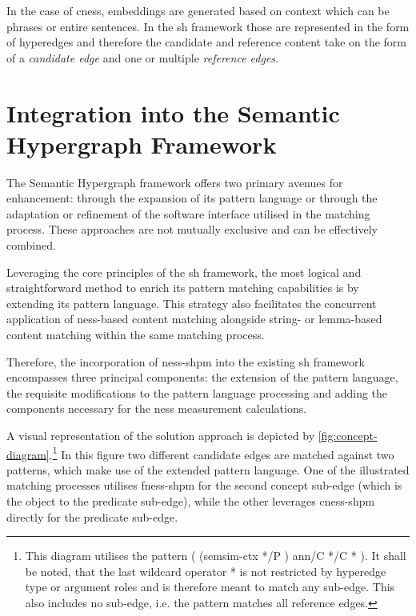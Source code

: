 \documentclass[11pt, numbers=noenddot]{scrreprt}
\begin{document}
In the case of \gls{cness}, embeddings are generated based on context which can be phrases or entire sentences. In the \gls{sh} framework those are represented in the form of hyperedges and therefore the candidate and reference content take on the form of a \textit{candidate edge} and one or multiple \textit{reference edges}. 

\section{Integration into the Semantic Hypergraph Framework}

The Semantic Hypergraph framework offers two primary avenues for enhancement: through the expansion of its pattern language or through the adaptation or refinement of the software interface utilised in the matching process. These approaches are not mutually exclusive and can be effectively combined.

Leveraging the core principles of the \gls{sh} framework, the most logical and straightforward method to enrich its pattern matching capabilities is by extending its pattern language. This strategy also facilitates the concurrent application of \gls{ness}-based content matching alongside string- or lemma-based content matching within the same matching process.

Therefore, the incorporation of \gls{ness-shpm} into the existing \gls{sh} framework encompasses three principal components: the extension of the pattern language, the requisite modifications to the pattern language processing and adding the components necessary for the \gls{ness} measurement calculations.


A visual representation of the solution approach is depicted by \cref{fig:concept-diagram}.\footnote{This diagram utilises the pattern \textsf{( (semsim-ctx */P ) ann/C */C * )}. It shall be noted, that the last wildcard operator \textsf{*} is not restricted by hyperedge type or argument roles and is therefore meant to match any sub-edge. This also includes no sub-edge, i.e. the pattern matches all reference edges.} In this figure two different candidate edges are matched against two patterns, which make use of the extended pattern language. One of the illustrated matching processes utilises \gls{fness-shpm} for the second concept sub-edge (which is the object to the predicate sub-edge), while the other leverages \gls{cness-shpm} directly for the predicate sub-edge.
\end{document}
